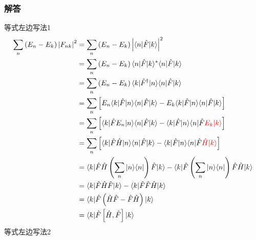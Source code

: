 \subsubsection{解答}
等式左边写法1
\begin{equation}
    \begin{aligned}
        \sum_n{\left( E_n-E_k \right) \left| F_{nk} \right|^2}&=\sum_n{\left( E_n-E_k \right) \left| \langle n|\hat{F}|k\rangle \right|^2}
\\
&=\sum_n{\left( E_n-E_k \right) \langle n|\hat{F}|k\rangle ^*\langle n|\hat{F}|k\rangle}
\\
&=\sum_n{\left( E_n-E_k \right) \langle k|\hat{F}^{\dagger}|n\rangle \langle n|\hat{F}|k\rangle}
\\
&=\sum_n{\left[ E_n\langle k|\hat{F}|n\rangle \langle n|\hat{F}|k\rangle -E_k\langle k|\hat{F}|n\rangle \langle n|\hat{F}|k\rangle \right]}
\\
&=\sum_n{\left[ \langle k|\hat{F}E_n|n\rangle \langle n|\hat{F}|k\rangle -\langle k|\hat{F}|n\rangle \langle n|\hat{F}{\color[RGB]{240, 0, 0} E_k|k\rangle } \right]}
\\
&=\sum_n{\left[ \langle k|\hat{F}\hat{H}|n\rangle \langle n|\hat{F}|k\rangle -\langle k|\hat{F}|n\rangle \langle n|\hat{F}{\color[RGB]{240, 0, 0} \hat{H}|k\rangle } \right]}
\\
&=\langle k|\hat{F}\hat{H}\left( \sum_n{|n\rangle \langle n|} \right) \hat{F}|k\rangle -\langle k|\hat{F}\left( \sum_n{|n\rangle \langle n|} \right) \hat{F}\hat{H}|k\rangle 
\\
&=\langle k|\hat{F}\hat{H}\hat{F}|k\rangle -\langle k|\hat{F}\hat{F}\hat{H}|k\rangle 
\\
&=\langle k|\hat{F}\left( \hat{H}\hat{F}-\hat{F}\hat{H} \right) |k\rangle 
\\
&=\langle k|\hat{F}\left[ \hat{H},\hat{F} \right] |k\rangle 
    \end{aligned}
\end{equation}
等式左边写法2
